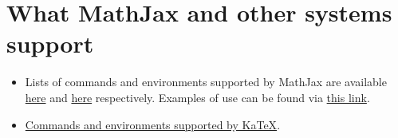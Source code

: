 \section{What MathJax and other systems support}
\begin{itemize}
\item Lists of commands and environments supported by MathJax are available \href{http://docs.mathjax.org/en/latest/tex.html#symbols}{here} and \href{http://docs.mathjax.org/en/latest/tex.html#environments}{here} respectively. Examples of use can be found via \href{http://meta.math.stackexchange.com/questions/5020/mathjax-basic-tutorial-and-quick-reference}{this link}.
\item \href{https://github.com/Khan/KaTeX/wiki/Function-Support-in-KaTeX}{Commands and environments supported by KaTeX}.
\end{itemize}
